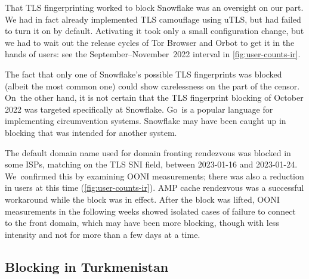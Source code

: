 \documentclass[letterpaper,twocolumn]{article}
\begin{document}
That TLS fingerprinting worked to block Snowflake
was an oversight on our part.
We had in fact already implemented TLS camouflage using uTLS,
but had failed to turn it on by default.
Activating it took only a small configuration change,
but we had to wait out the release cycles of Tor Browser and Orbot
to get it in the hands of users:
see the September--November~2022 interval in \autoref{fig:user-counts-ir}.

The fact that only one of Snowflake's possible TLS fingerprints was blocked
(albeit the most common one)
could show carelessness on the part of the censor.
On~the other hand, it is not certain that the TLS fingerprint blocking of October 2022
was targeted specifically at Snowflake.
Go~is a popular language for implementing circumvention systems.
Snowflake may have been caught up in blocking that was intended for another system.


The default domain name used for domain fronting rendezvous
was blocked in some ISPs, matching on the TLS SNI field,
between \mbox{2023-01-16} and \mbox{2023-01-24}.
We~confirmed this by examining OONI measurements;
there was also a reduction in users at this time (\autoref{fig:user-counts-ir}).
AMP cache rendezvous was a successful workaround while the block was in effect.
After the block was lifted,
OONI measurements in the following weeks showed isolated cases
of failure to connect to the front domain,
which may have been more blocking,
though with less intensity and not for more than a few days at a time.

\subsection{Blocking in Turkmenistan}
\label{sec:block-tm}

\end{document}

